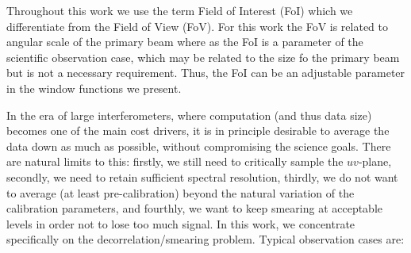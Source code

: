 \documentclass[useAMS,usenatbib]{mn2e}
\begin{document}
Throughout this work we use the term Field of Interest (FoI) which we
differentiate from the Field of View (FoV). For this work the FoV is related to
angular scale of the primary beam where as the FoI is a parameter of the 
scientific observation case, which may be related to the size fo the primary
beam but is not a necessary requirement. Thus, the FoI can be an adjustable
parameter in the window functions we present.

In the era of large interferometers, where computation (and thus data size)
becomes one of the main cost drivers, it is in principle desirable to average
the data down as much as possible, without compromising the science goals.
There are natural limits to this: firstly, we still need to critically sample
the $uv$-plane, secondly, we need to retain sufficient spectral resolution,
thirdly, we do not want to average (at least pre-calibration) beyond the
natural variation of the calibration parameters, and fourthly, we want to keep
smearing at acceptable levels in order not to lose too much signal. In this
work, we concentrate specifically on the decorrelation/smearing problem. Typical
observation cases are:
\end{document}
